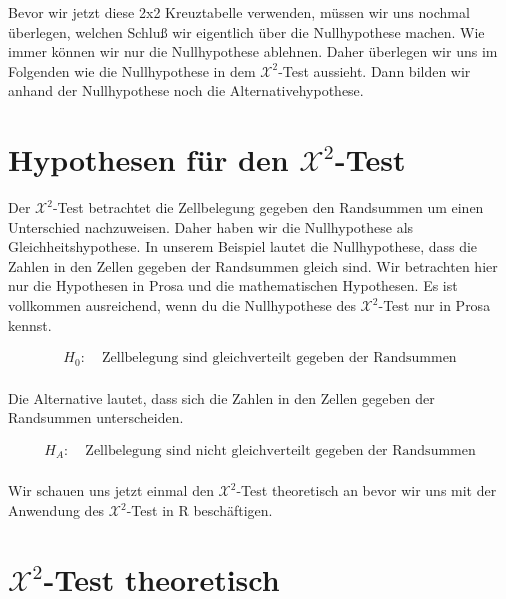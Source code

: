 \documentclass[
  letterpaper,
]{scrbook}
\begin{document}
Bevor wir jetzt diese 2x2 Kreuztabelle verwenden, müssen wir uns nochmal
überlegen, welchen Schluß wir eigentlich über die Nullhypothese machen.
Wie immer können wir nur die Nullhypothese ablehnen. Daher überlegen wir
uns im Folgenden wie die Nullhypothese in dem \(\mathcal{X}^2\)-Test
aussieht. Dann bilden wir anhand der Nullhypothese noch die
Alternativehypothese.

\hypertarget{hypothesen-fuxfcr-den-mathcalx2-test}{%
\section{\texorpdfstring{Hypothesen für den
\(\mathcal{X}^2\)-Test}{Hypothesen für den \textbackslash mathcal\{X\}\^{}2-Test}}\label{hypothesen-fuxfcr-den-mathcalx2-test}}

Der \(\mathcal{X}^2\)-Test betrachtet die Zellbelegung gegeben den
Randsummen um einen Unterschied nachzuweisen. Daher haben wir die
Nullhypothese als Gleichheitshypothese. In unserem Beispiel lautet die
Nullhypothese, dass die Zahlen in den Zellen gegeben der Randsummen
gleich sind. Wir betrachten hier nur die Hypothesen in Prosa und die
mathematischen Hypothesen. Es ist vollkommen ausreichend, wenn du die
Nullhypothese des \(\mathcal{X}^2\)-Test nur in Prosa kennst.

\[
\begin{align*}
H_0: &\; \mbox{Zellbelegung sind gleichverteilt gegeben der Randsummen}\\
\end{align*}
\]

Die Alternative lautet, dass sich die Zahlen in den Zellen gegeben der
Randsummen unterscheiden.

\[
\begin{align*}
H_A: &\; \mbox{Zellbelegung sind nicht gleichverteilt gegeben der Randsummen}\\
\end{align*}
\]

Wir schauen uns jetzt einmal den \(\mathcal{X}^2\)-Test theoretisch an
bevor wir uns mit der Anwendung des \(\mathcal{X}^2\)-Test in R
beschäftigen.

\hypertarget{mathcalx2-test-theoretisch}{%
\section{\texorpdfstring{\(\mathcal{X}^2\)-Test
theoretisch}{\textbackslash mathcal\{X\}\^{}2-Test theoretisch}}\label{mathcalx2-test-theoretisch}}
\end{document}
